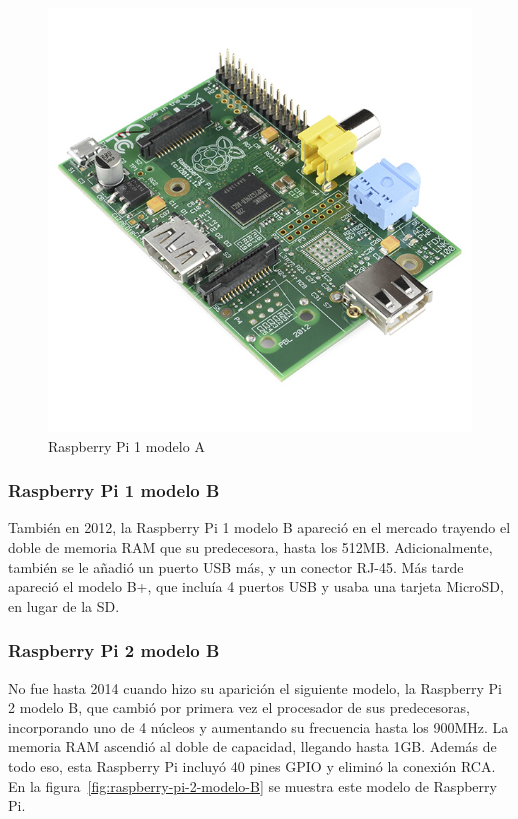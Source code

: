 \begin{figure}[tbp]
\centering
\includegraphics[scale = 1.5]{fig/Raspberry-Pi-1-modelo-A.jpg}
\caption{Raspberry Pi 1 modelo A}
\label{fig:raspberry-pi-1-modelo-a}
\end{figure}

\subsubsection{Raspberry Pi 1 modelo B}

\noindent También en 2012, la Raspberry Pi 1 modelo B apareció en el mercado trayendo el doble de memoria RAM que su predecesora, hasta los 512MB. Adicionalmente, también se le añadió un puerto USB más, y un conector RJ-45. Más tarde apareció el modelo B+, que incluía 4 puertos USB y usaba una tarjeta MicroSD, en lugar de la SD.

\subsubsection{Raspberry Pi 2 modelo B}

\noindent No fue hasta 2014 cuando hizo su aparición el siguiente modelo, la Raspberry Pi 2 modelo B, que cambió por primera vez el procesador de sus predecesoras, incorporando uno de 4 núcleos y aumentando su frecuencia hasta los 900MHz. La memoria RAM ascendió al doble de capacidad, llegando hasta 1GB. Además de todo eso, esta Raspberry Pi incluyó 40 pines GPIO y eliminó la conexión RCA. En la figura~\ref{fig:raspberry-pi-2-modelo-B} se muestra este modelo de Raspberry Pi.

